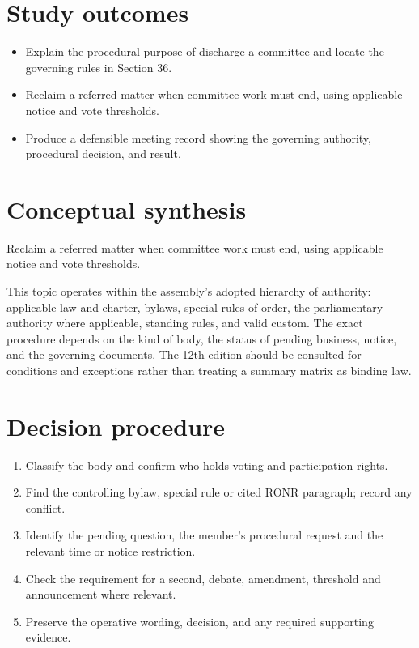 \documentclass[11pt]{article}
\begin{document}
\SuiteOpen
{}
\section{Study outcomes}
\begin{itemize}[leftmargin=*,itemsep=4pt]
\item Explain the procedural purpose of discharge a committee and locate the governing rules in Section 36.
\item Reclaim a referred matter when committee work must end, using applicable notice and vote thresholds.
\item Produce a defensible meeting record showing the governing authority, procedural decision, and result.
\end{itemize}

\section{Conceptual synthesis}
Reclaim a referred matter when committee work must end, using applicable notice and vote thresholds.

This topic operates within the assembly’s adopted hierarchy of authority: applicable law and charter, bylaws, special rules of order, the parliamentary authority where applicable, standing rules, and valid custom. The exact procedure depends on the kind of body, the status of pending business, notice, and the governing documents. The 12th edition should be consulted for conditions and exceptions rather than treating a summary matrix as binding law.
\section{Decision procedure}
\begin{enumerate}[leftmargin=*,itemsep=4pt]
\item Classify the body and confirm who holds voting and participation rights.
\item Find the controlling bylaw, special rule or cited RONR paragraph; record any conflict.
\item Identify the pending question, the member’s procedural request and the relevant time or notice restriction.
\item Check the requirement for a second, debate, amendment, threshold and announcement where relevant.
\item Preserve the operative wording, decision, and any required supporting evidence.
\end{enumerate}
\end{document}
